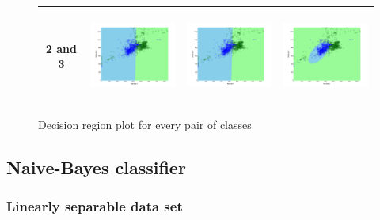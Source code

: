 \documentclass[a4paper]{article}
\begin{document}
\begin{figure}
\begin{tabular}{|c|c|c|c|}
					\hline
					2 and
					3&\includegraphics[width=40mm,height=30mm]{bayes/real/pair/23/all_cov.png}&\includegraphics[width=40mm,height=30mm]{bayes/real/pair/23/avg_cov.png}
					&\includegraphics[width=40mm,height=30mm]{bayes/real/pair/23/diff_cov.png}\\
					\hline
				\end{tabular}
				\caption{Decision region plot for every pair of classes}
			\end{figure}
	

	\subsection{Naive-Bayes classifier}

			\subsubsection{Linearly separable data set}
			
			\
		
			
		
\end{document}
